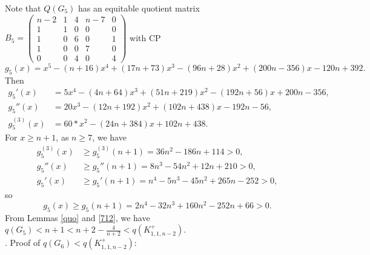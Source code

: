 \documentclass[12pt]{article}
\begin{document}
\begin{appendices}
Note that $Q(G_5)$ has an equitable quotient matrix
$B_5=
\left(\begin{smallmatrix}
n-2 &  1  & 4 & n-7 & 0 \\
1   &  1  & 0 & 0   & 0 \\
1   &  0  & 6 & 0   & 1 \\
1   &  0  & 0 & 7   & 0 \\
0   &  0  & 4 & 0   & 4
\end{smallmatrix}\right)$
with CP
\[
g_5(x)=x^5 -(n +16)x^4 + (17n + 73)x^3 - (96n +28)x^2 + (200n - 356)x - 120n + 392.
\]
Then
\begin{align*}
g_5'(x)&=5x^4 - ( 4n + 64)x^3 + (51n + 219)x^2 -( 192n + 56)x + 200n - 356,\\
g_5''(x)&=20x^3 - ( 12n + 192)x^2 + (102n + 438)x - 192n - 56,\\
g_5^{(3)}(x)&=60*x^2 -( 24n + 384)x + 102n + 438.
\end{align*}
For $x\ge n+1$, as $n\ge 7$, we have
\begin{align*}
g_5^{(3)}(x)&\ge g_5^{(3)}(n+1)=36n^2 - 186n + 114>0,\\
g_5''(x)&\ge g_5''(n+1)=8n^3 - 54n^2 + 12n + 210>0,\\
g_5'(x)&\ge g_5'(n+1)=n^4 - 5n^3 - 45n^2 + 265n - 252>0,
\end{align*}
so
\[
g_5(x)\ge g_5(n+1)=2n^4 - 32n^3 + 160n^2 - 252n + 66>0.
\]
From Lemmas \ref{quo} and \ref{712}, we have $q(G_5)<n+1<n+2-\frac{4}{n+2}<q(K_{1,1,n-2}^+)$.\\



. Proof of  $q(G_6)<q(K_{1,1,n-2}^+)$:


\end{appendices}
\end{document}
